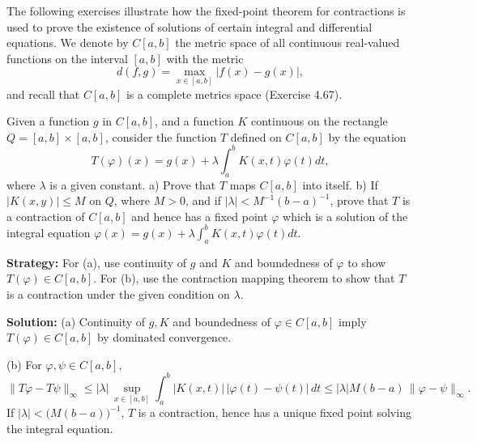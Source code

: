 The following exercises illustrate how the fixed-point theorem for contractions is used to prove the existence of solutions of certain integral and differential equations. We denote by $C[a, b]$ the metric space of all continuous real-valued functions on the interval $[a, b]$ with the metric $$d(f, g) = \max_{x \in [a, b]} |f(x) - g(x)|,$$ 
and recall that $C[a,b]$ is a complete metrics space (Exercise 4.67).




\begin{problembox}
\begin{problemstatement}
Given a function $g$ in $C[a, b]$, and a function $K$ continuous on the rectangle $Q = [a, b] \times [a, b]$, consider the function $T$ defined on $C[a, b]$ by the equation 
\[T(\varphi)(x) = g(x) + \lambda \int_a^b K(x, t)\varphi(t) dt,\]
where $\lambda$ is a given constant.
a) Prove that $T$ maps $C[a, b]$ into itself.
b) If $|K(x, y)| \leq M$ on $Q$, where $M > 0$, and if $|\lambda| < M^{-1}(b - a)^{-1}$, prove that $T$ is a contraction of $C[a, b]$ and hence has a fixed point $\varphi$ which is a solution of the integral equation $\varphi(x) = g(x) + \lambda \int_a^b K(x, t)\varphi(t) dt$.
\end{problemstatement}
\end{problembox}

\noindent\textbf{Strategy:} For (a), use continuity of $g$ and $K$ and boundedness of $\varphi$ to show $T(\varphi) \in C[a,b]$. For (b), use the contraction mapping theorem to show that $T$ is a contraction under the given condition on $\lambda$.

\bigskip\noindent\textbf{Solution:}
(a) Continuity of $g,K$ and boundedness of $\varphi\in C[a,b]$ imply $T(\varphi)\in C[a,b]$ by dominated convergence.

(b) For $\varphi,\psi\in C[a,b]$,
\[\|T\varphi-T\psi\|_\infty \le |\lambda|\,\sup_{x\in[a,b]}\int_a^b |K(x,t)|\,|\varphi(t)-\psi(t)|\,dt \le |\lambda|M(b-a)\,\|\varphi-\psi\|_\infty.
\]
If $|\lambda|<\big(M(b-a)\big)^{-1}$, $T$ is a contraction, hence has a unique fixed point solving the integral equation.




